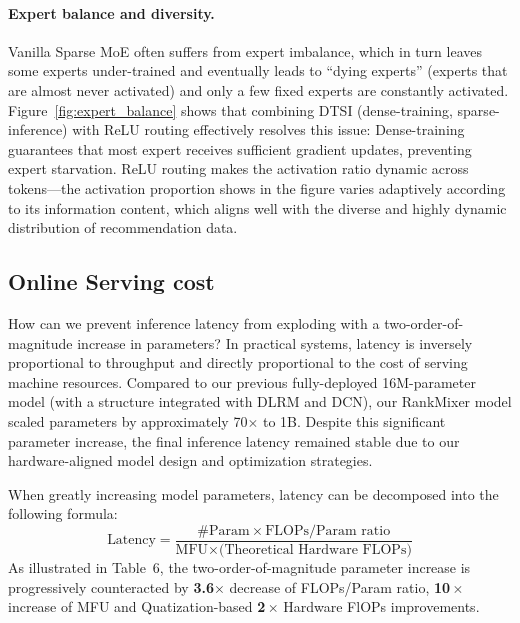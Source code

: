 \paragraph{Expert balance and diversity.}
Vanilla Sparse MoE often suffers from expert imbalance, which in turn leaves some experts under-trained and eventually leads to “dying experts” (experts that are almost never activated) and only a few fixed experts are constantly activated.
Figure~\ref{fig:expert_balance} shows that combining DTSI (dense-training, sparse-inference) with ReLU routing effectively resolves this issue: Dense-training guarantees that most expert receives sufficient gradient updates, preventing expert starvation.
ReLU routing makes the activation ratio dynamic across tokens—the activation proportion shows in the figure varies adaptively according to its information content, which aligns well with the diverse and highly dynamic distribution of recommendation data.
\subsection{Online Serving cost}


How can we prevent inference latency from exploding with a two-order-of-magnitude increase in parameters? In practical systems, latency is inversely proportional to throughput and directly proportional to the cost of serving machine resources. 
Compared to our previous fully-deployed 16M-parameter model (with a structure integrated with DLRM and DCN), our RankMixer model scaled parameters by approximately 70$\times$ to 1B. Despite this significant parameter increase, the final inference latency remained stable due to our hardware-aligned model design and optimization strategies.

When greatly increasing model parameters, latency can be decomposed into the following formula:
\[
\text{Latency} = \frac{\#\text{Param} \times \text{FLOPs/Param ratio}}{\text{MFU} \times \text{(Theoretical Hardware FLOPs)}}
\]
As illustrated in Table~6, the two-order-of-magnitude parameter increase is progressively counteracted by \textbf{3.6$\times$} decrease of FLOPs/Param ratio, \textbf{10\,$\times$} increase of MFU and Quatization-based \textbf{2\,$\times$} Hardware FlOPs improvements.


